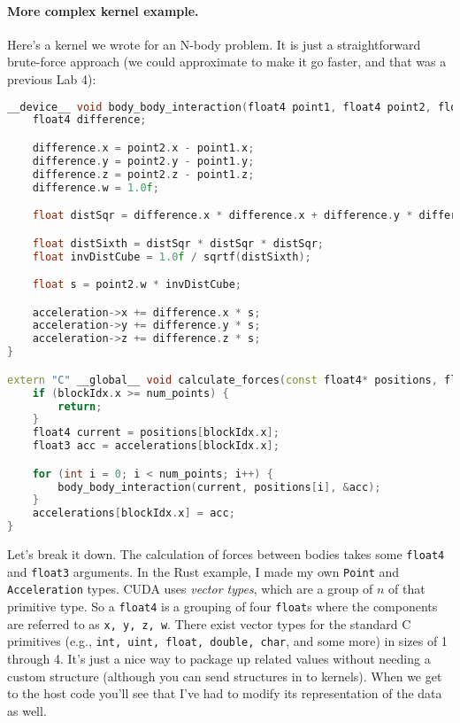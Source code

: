 \paragraph{More complex kernel example.} Here's a kernel we wrote for an N-body problem. It is just a straightforward brute-force approach (we could approximate to make it go faster, and that was a previous Lab 4):

\begin{lstlisting}[language=C++]
__device__ void body_body_interaction(float4 point1, float4 point2, float3 *acceleration) {
    float4 difference;

    difference.x = point2.x - point1.x;
    difference.y = point2.y - point1.y;
    difference.z = point2.z - point1.z;
    difference.w = 1.0f;

    float distSqr = difference.x * difference.x + difference.y * difference.y + difference.z * difference.z + 1e-10;

    float distSixth = distSqr * distSqr * distSqr;
    float invDistCube = 1.0f / sqrtf(distSixth);

    float s = point2.w * invDistCube;

    acceleration->x += difference.x * s;
    acceleration->y += difference.y * s;
    acceleration->z += difference.z * s;
}

extern "C" __global__ void calculate_forces(const float4* positions, float3* accelerations, int num_points) {
    if (blockIdx.x >= num_points) {
        return;
    }
    float4 current = positions[blockIdx.x];
    float3 acc = accelerations[blockIdx.x];

    for (int i = 0; i < num_points; i++) {
        body_body_interaction(current, positions[i], &acc);
    }
    accelerations[blockIdx.x] = acc;
}
\end{lstlisting}

Let's break it down. The calculation of forces between bodies takes some \texttt{float4} and \texttt{float3} arguments. In the Rust example, I made my own \texttt{Point} and \texttt{Acceleration} types. CUDA uses \textit{vector types}, which are a group of $n$ of that primitive type. So a \texttt{float4} is a grouping of four \texttt{float}s where the components are referred to as \texttt{x, y, z, w}. There exist vector types for the standard C primitives (e.g., \texttt{int, uint, float, double, char}, and some more) in sizes of 1 through 4. It's just a nice way to package up related values without needing a custom structure (although you can send structures in to kernels). When we get to the host code you'll see that I've had to modify its representation of the data as well.

